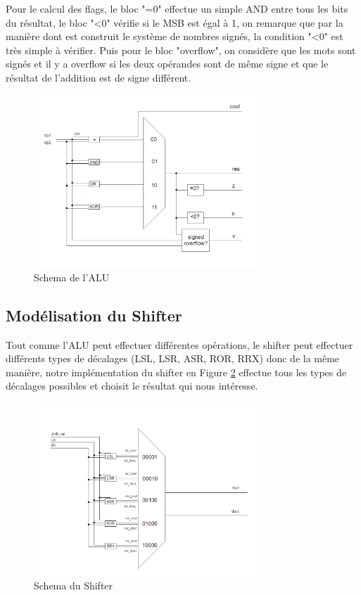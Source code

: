 \documentclass{article}
\begin{document}
Pour le calcul des flags, le bloc "=0" effectue un simple AND entre tous les bits du résultat,
le bloc "<0" vérifie si le MSB est égal à 1, on remarque que par la manière dont est construit
le système de nombres signés, la condition "<0" est très simple à vérifier. Puis pour le bloc "overflow",
on considère que les mots sont signés et il y a overflow si les deux opérandes sont de même signe et que
le résultat de l'addition est de signe différent.

\begin{figure}[H]
\includegraphics[width=0.75\textwidth]{pics/alu.png}
\centering
\caption{Schema de l'ALU}
\label{alu}
\end{figure}

\subsection{Modélisation du Shifter}

Tout comme l'ALU peut effectuer différentes opérations, le shifter peut effectuer différents
types de décalages (LSL, LSR, ASR, ROR, RRX) donc de la même manière, notre implémentation
du shifter en Figure \ref{shifter} effectue tous les types de décalages possibles et choisit
le résultat qui nous intéresse.

\begin{figure}[H]
\includegraphics[width=0.75\textwidth]{pics/shifter.png}
\centering
\caption{Schema du Shifter}
\label{shifter}
\end{figure}
\end{document}
